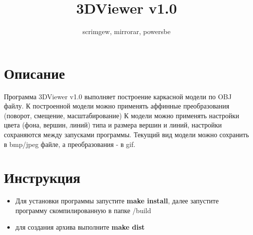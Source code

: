 \documentclass{article}
\title{3DViewer v1.0}
\author{scrimgew, mirrorar, powersbe}
\begin{document}
\maketitle
\section{Описание}
Программа 3DViewer v1.0 выполняет построение каркасной модели по OBJ файлу. 
К построенной модели можно применять аффинные преобразования (поворот, смещение, масштабирование)
К модели можно применять настройки цвета (фона, вершин, линий) типа и размера вершин и линий, настройки сохраняются между запусками программы.
Текущий вид модели можно сохранить в bmp/jpeg файле, а преобразования - в gif.


\section{Инструкция}
\begin{itemize}
\item Для установки программы запустите \textbf{make install}, далее запустите программу скомпилированную в папке /build
\item для создания архива выполните \textbf{make dist}
\end{itemize}
\end{document}
